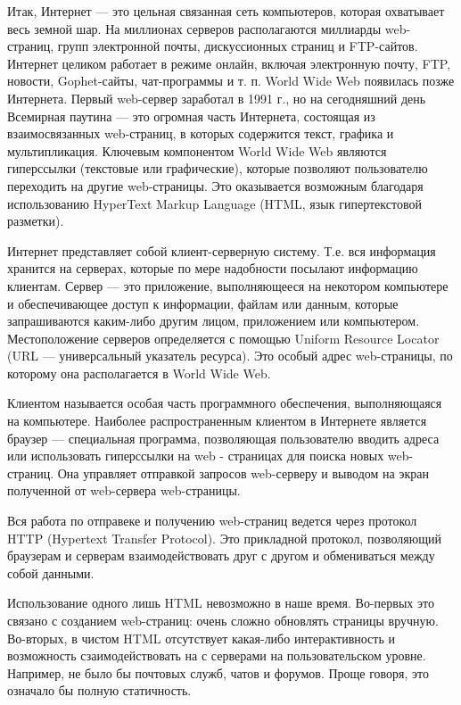 \documentclass[14pt,a4paper]{extreport}
\begin{document}
	\parindent=1cm Итак, Интернет — это цельная связанная сеть компьютеров, которая охватывает весь земной шар. На миллионах серверов располагаются миллиарды web-страниц, групп электронной почты, дискуссионных страниц и FTP-сайтов. Интернет целиком работает в режиме онлайн, включая электронную почту, FTP, новости, Gophet-сайты, чат-программы и т. п. World Wide Web появилась позже Интернета. Первый web-сервер заработал в 1991 г., но на сегодняшний день Всемирная паутина — это огромная часть Интернета, состоящая из взаимосвязанных web-страниц, в которых содержится текст, графика и мультипликация. Ключевым компонентом World Wide Web являются гиперссылки (текстовые или графические), которые позволяют пользователю переходить на другие web-страницы. Это оказывается возможным благодаря использованию HyperText Markup Language (HTML, язык гипертекстовой разметки).\par
	Интернет представляет собой клиент-серверную систему. Т.е. вся информация хранится на серверах, которые по мере надобности посылают информацию клиентам. Сервер — это приложение, выполняющееся на некотором компьютере и обеспечивающее доступ к информации, файлам или данным, которые запрашиваются каким-либо другим лицом, приложением или компьютером. Местоположение серверов определяется с помощью Uniform Resource Locator (URL — универсальный указатель ресурса). Это особый адрес web-страницы, по которому она располагается в World Wide Web.\par 		Клиентом называется особая часть программного обеспечения, выполняющаяся на компьютере. Наиболее распространенным клиентом в Интернете является браузер — специальная программа, позволяющая пользователю вводить адреса или использовать гиперссылки на web - страницах для поиска новых web-страниц. Она управляет отправкой запросов web-серверу и выводом на экран полученной от web-сервера web-страницы.\par
	Вся работа по отправеке и получению web-страниц ведется через протокол HTTP (Hypertext Transfer Protocol). Это прикладной протокол, позволяющий браузерам и серверам взаимодействовать друг с другом и обмениваться между собой данными.\par
	Использование одного лишь HTML невозможно в наше время. Во-первых это связано с созданием web-страниц: очень сложно обновлять страницы вручную. Во-вторых, в чистом HTML отсутствует какая-либо интерактивность и возможность сзаимодействовать на с серверами на пользовательском уровне. Например, не было бы почтовых служб, чатов и форумов. Проще говоря, это означало бы полную статичность.\par
\end{document}
